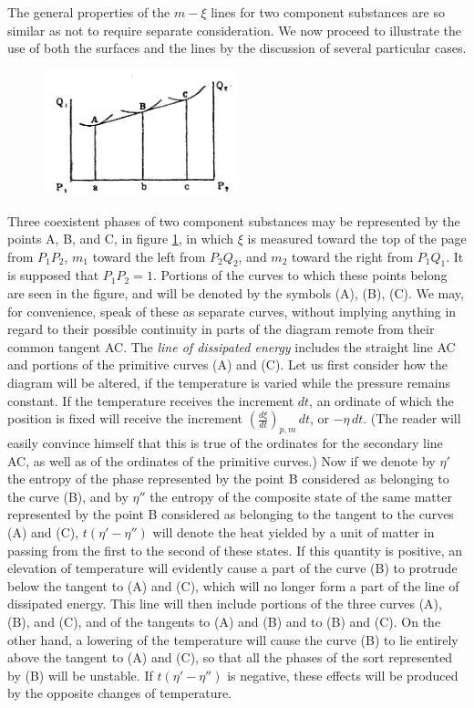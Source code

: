 \documentclass[12pt]{article}
\begin{document}
The general properties of the $m\!-\xi$ lines for two component substances are so similar as not to require separate consideration. We now proceed to illustrate the use of both the surfaces and the lines by the discussion of several particular cases.


\begin{figure} %
    \centering
    \includegraphics[width=0.5\textwidth]{fig_1}
    \caption{ }
    \label{fig_1}
\end{figure}
Three coexistent phases of two component substances may be represented by the points A, B, and C, in figure \ref{fig_1}, in which $\xi$ is  measured toward the top of the page from $P_1 P_2$, $m_1$ toward the left from $P_2 Q_2$, and $m_2$ toward the right from $P_1 Q_1$. It is supposed that $P_1 P_2= 1$. Portions of the curves to which these points belong are seen in the figure, and will be denoted by the symbols (A), (B), (C). We may, for convenience, speak of these as separate curves, without implying anything in regard to their possible continuity in parts of the diagram remote from their common tangent AC. The \textit{line of dissipated energy} includes the straight line AC and portions of the primitive curves (A) and (C). Let us first consider how the diagram will be altered, if the temperature is varied while the pressure remains constant. If the temperature receives the increment $dt$, an ordinate of which the position is fixed will receive the increment $\left( \frac{d \xi}{dt}\right)_{p,m} \, dt$, or $-\eta \, dt$. (The reader will easily convince himself that this is true of the ordinates for the secondary line AC, as well as of the ordinates of the primitive curves.) Now if we denote by $\eta'$ the entropy of the phase represented by the point B considered as belonging to the curve (B), and by $\eta''$ the entropy of the composite state of the same matter represented by the
point B considered as belonging to the tangent to the curves (A) and (C), $t(\eta'-\eta'')$ will denote the heat yielded by a unit of matter in passing from the first to the second of these states. If this quantity is positive, an elevation of temperature will evidently cause a part of the curve (B) to protrude below the tangent to (A) and (C), which will no longer form a part of the line of dissipated energy. This line will then include portions of the three curves (A), (B), and (C), and of the tangents to (A) and (B) and to (B) and (C). On the other hand, a lowering of the temperature will cause the curve (B) to lie entirely above the tangent to (A) and (C), so that all the phases of the sort represented by (B) will be unstable. If $t(\eta'- \eta'')$ is negative, these effects will be produced by the opposite changes of temperature.
\end{document}
